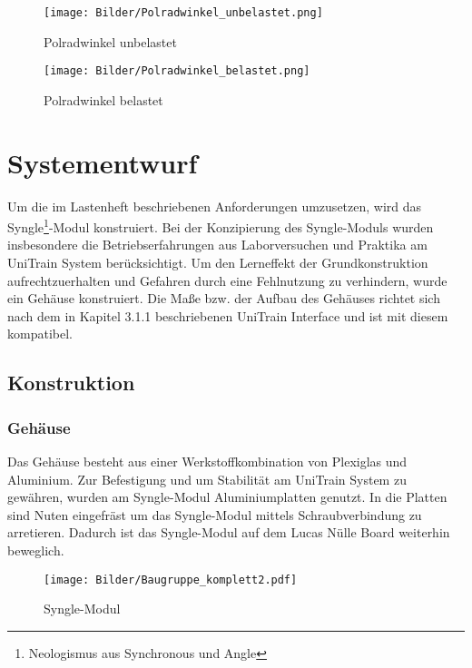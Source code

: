 \begin{figure}[H]
	\centering
	\texttt{[image: Bilder/Polradwinkel\_unbelastet.png]} 
	\caption{Polradwinkel unbelastet}
	\label{fig: Polradwinkel unbelastet}
\end{figure}


\begin{figure}[H]
	\centering
	\texttt{[image: Bilder/Polradwinkel\_belastet.png]} 
	\caption{Polradwinkel belastet}
	\label{fig: Polradwinkel belastet}
\end{figure}



\chapter{Systementwurf}

Um die im Lastenheft beschriebenen Anforderungen umzusetzen, wird das Syngle\footnote{Neologismus aus \glqq Synchronous\grqq{} und \glqq Angle\grqq{}}-Modul konstruiert.
Bei der Konzipierung des Syngle-Moduls wurden insbesondere die Betriebserfahrungen aus Laborversuchen und Praktika am UniTrain System berücksichtigt. Um den Lerneffekt der Grundkonstruktion aufrechtzuerhalten und Gefahren durch eine Fehlnutzung zu verhindern, wurde ein Gehäuse konstruiert. Die Maße bzw. der Aufbau des Gehäuses richtet sich nach dem in Kapitel 3.1.1 beschriebenen UniTrain Interface und ist mit diesem kompatibel.

\section{Konstruktion}

\subsection{Gehäuse}

 Das Gehäuse besteht aus einer Werkstoffkombination von Plexiglas und Aluminium.
 Zur Befestigung und um Stabilität am UniTrain System zu gewähren, wurden am Syngle-Modul Aluminiumplatten genutzt. In die Platten sind Nuten eingefräst um das Syngle-Modul mittels Schraubverbindung zu arretieren. Dadurch ist das Syngle-Modul auf dem Lucas Nülle Board weiterhin beweglich.
 
 
 \begin{figure}[H]
 	\centering
 	\texttt{[image: Bilder/Baugruppe\_komplett2.pdf]} 
 	\caption{Syngle-Modul}
 	\label{fig:Syngle-Modul}
 	
 \end{figure}
 
